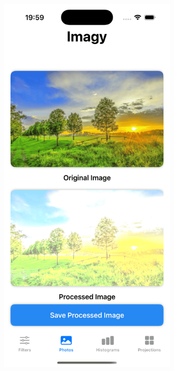 \documentclass[a4paper]{article}
\begin{document}
\begin{figure}[H]
    \centering
    \begin{subfigure}{0.2\textwidth}
        \centering
        \includegraphics[width=\linewidth]{images/trees_brightness_118.png}

\end{subfigure}
\end{figure}
\end{document}
